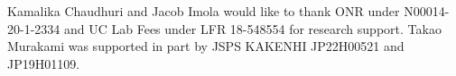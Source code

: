 \documentclass[sigconf]{acmart}
\begin{document}
\begin{acks}
Kamalika Chaudhuri and Jacob Imola would like to thank ONR under N00014-20-1-2334 and UC Lab Fees under LFR 18-548554  for research support.
Takao Murakami was supported in part by JSPS KAKENHI JP22H00521 and JP19H01109.
\end{acks}




% 
\end{document}
